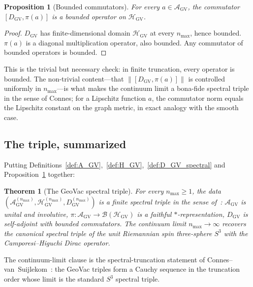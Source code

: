 \documentclass[11pt]{article}
\newtheorem{theorem}{Theorem}
\newtheorem{proposition}{Proposition}
\begin{document}
\begin{proposition}[Bounded commutators]
\label{prop:bounded_commutators}
For every $a \in \mathcal{A}_{\mathrm{GV}}$, the commutator
$[D_{\mathrm{GV}}, \pi(a)]$ is a bounded operator on
$\mathcal{H}_{\mathrm{GV}}$.
\end{proposition}

\begin{proof}
$D_{\mathrm{GV}}$ has finite-dimensional domain
$\mathcal{H}_{\mathrm{GV}}$ at every $n_{\max}$, hence bounded.
$\pi(a)$ is a diagonal multiplication operator, also bounded.  Any
commutator of bounded operators is bounded.
\end{proof}

This is the trivial but necessary check: in finite truncation, every
operator is bounded.  The non-trivial content---that
$\|[D_{\mathrm{GV}}, \pi(a)]\|$ is controlled uniformly in
$n_{\max}$---is what makes the continuum limit a bona-fide spectral
triple in the sense of Connes; for a Lipschitz function $a$, the
commutator norm equals the Lipschitz constant on the graph metric, in
exact analogy with the smooth case.

\subsection{The triple, summarized}

Putting Definitions~\ref{def:A_GV},~\ref{def:H_GV},~\ref{def:D_GV_spectral}
and Proposition~\ref{prop:bounded_commutators} together:

\begin{theorem}[The GeoVac spectral triple]
\label{thm:GV_triple}
For every $n_{\max} \ge 1$, the data
$(\mathcal{A}_{\mathrm{GV}}^{(n_{\max})},
\mathcal{H}_{\mathrm{GV}}^{(n_{\max})},
D_{\mathrm{GV}}^{(n_{\max})})$ is a finite spectral triple in the
sense of~\cite{connes1995}: $\mathcal{A}_{\mathrm{GV}}$ is unital and
involutive, $\pi: \mathcal{A}_{\mathrm{GV}} \to
\mathcal{B}(\mathcal{H}_{\mathrm{GV}})$ is a faithful
$*$-representation, $D_{\mathrm{GV}}$ is self-adjoint with bounded
commutators.  The continuum limit $n_{\max} \to \infty$ recovers the
canonical spectral triple of the unit Riemannian spin three-sphere
$S^3$ with the Camporesi--Higuchi Dirac operator.
\end{theorem}

The continuum-limit clause is the spectral-truncation statement of
Connes--van~Suijlekom~\cite{connes_vs2021,hekkelman2022,hekkelman_mcdonald2024}:
the GeoVac triples form a Cauchy sequence in the truncation order whose
limit is the standard $S^3$ spectral triple.
\end{document}
